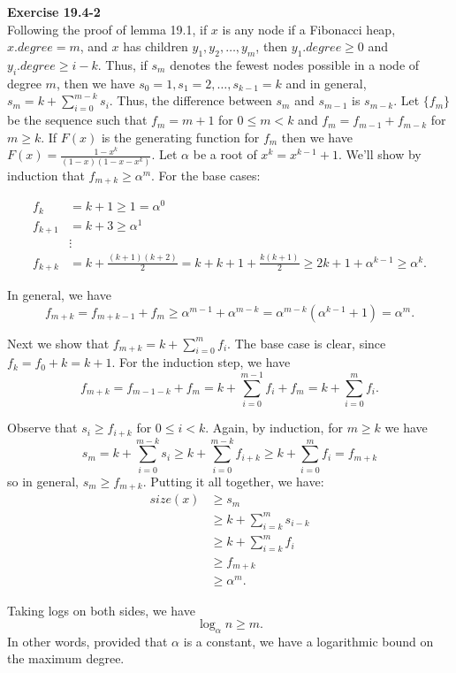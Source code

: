\documentclass{article}
\begin{document}
\noindent\textbf{Exercise 19.4-2}\\

Following the proof of lemma 19.1, if $x$ is any node if a Fibonacci heap, $x.degree = m$, and $x$ has children $y_1, y_2, \ldots, y_m$, then $y_1.degree \geq 0$ and $y_i.degree \geq i-k$.  Thus, if $s_m$ denotes the fewest nodes possible in a node of degree $m$, then we have $s_0 = 1, s_1 = 2, \ldots, s_{k-1} = k$ and in general, $s_m = k + \sum_{i=0}^{m-k}s_i$.  Thus, the difference between $s_{m}$ and $s_{m-1}$ is $s_{m-k}$.  Let $\{f_m\}$ be the sequence such that $f_m = m+1$ for $0 \leq m < k$ and $f_m = f_{m-1} + f_{m-k}$ for $m \geq k$. If $F(x)$ is the generating function for $f_m$ then we have $F(x) = \frac{1-x^k}{(1-x)(1-x-x^k)}$.  Let $\alpha$ be a root of $x^k = x^{k-1} + 1$.  We'll show by induction that $f_{m+k} \geq \alpha^m$.  For the base cases:

\begin{align*} 
f_k &= k+1 \geq 1 = \alpha^0 \\
 f_{k+1} &= k+3 \geq \alpha^1 \\
&\vdots \\
f_{k+k} &= k + \frac{(k+1)(k+2)}{2}  = k + k + 1 + \frac{k(k+1)}{2} \geq 2k + 1 + \alpha^{k-1} \geq \alpha^k.
\end{align*}

In general, we have
\[ f_{m+k} = f_{m+k-1} + f_m \geq \alpha^{m-1} + \alpha^{m-k} = \alpha^{m-k}(\alpha^{k-1} + 1) = \alpha^m.\]

Next we show that $f_{m+k} = k + \sum_{i=0}^m f_i$.  The base case is clear, since $f_k = f_0 + k = k+1$.  For the induction step, we have
\[ f_{m+k} = f_{m-1-k} + f_{m} = k + \sum_{i=0}^{m-1}f_i + f_m =  k + \sum_{i=0}^{m}f_i .\]

Observe that $s_i \geq f_{i+k}$ for $0 \leq i < k$.  Again, by induction, for $m \geq k$ we have
\[ s_m = k + \sum_{i=0}^{m-k} s_i \geq k + \sum_{i=0}^{m-k} f_{i+k} \geq k + \sum_{i=0}^{m} f_i = f_{m+k} \]
so in general, $s_m \geq f_{m+k}$.  Putting it all together, we have:
\begin{align*}
size(x) &\geq s_m \\
& \geq k + \sum_{i=k}^m s_{i-k} \\
&\geq k + \sum_{i=k}^m f_i \\
&\geq f_{m+k} \\
&\geq \alpha^m.
\end{align*}

Taking logs on both sides, we have 
\[ \log_{\alpha} n \geq m.\]
In other words, provided that $\alpha$ is a constant, we have a logarithmic bound on the maximum degree. \\
\end{document}
